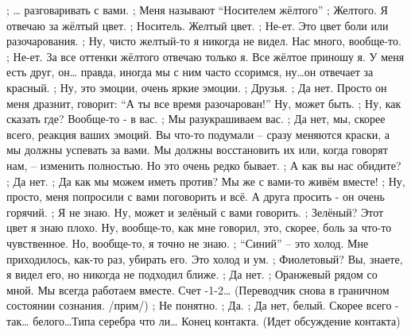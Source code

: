 ; …  разговаривать с вами.
; Меня называют ``Носителем жёлтого”
; Желтого. Я отвечаю за жёлтый цвет.
; Носитель. Желтый цвет.
; Не-ет. Это цвет  боли или разочарования.
; Ну, чисто желтый-то  я никогда не видел. Нас много, вообще-то.
; Не-ет. За все оттенки жёлтого отвечаю только я. Все жёлтое приношу я.  У меня есть друг,  он… правда, иногда мы с ним часто ссоримся, ну…он  отвечает за красный.
; Ну, это эмоции,  очень яркие эмоции.
; Друзья.
; Да нет. Просто он меня дразнит, говорит: ``А ты все время разочарован!'' Ну, может быть.
;  Ну, как сказать где? Вообще-то -  в вас.
; Мы разукрашиваем вас.
; Да нет, мы, скорее всего, реакция ваших эмоций. Вы что-то подумали – сразу меняются краски, а мы должны успевать за вами. Мы должны восстановить их или,  когда говорят нам, – изменить полностью. Но это очень редко бывает.
; А как вы нас обидите?
; Да нет.
; Да как мы можем иметь против? Мы же с вами-то живём вместе!
; Ну, просто, меня попросили с вами поговорить и всё.  А друга просить -  он очень горячий. 
; Я не знаю. Ну, может и зелёный с вами говорить.
; Зелёный? Этот цвет я знаю плохо. Ну, вообще-то, как мне говорил, это, скорее, боль за что-то чувственное. Но, вообще-то, я точно не знаю.
; ``Синий'' – это холод. Мне приходилось, как-то раз, убирать его. Это холод  и  ум.
; Фиолетовый? Вы, знаете, я видел его, но никогда не подходил ближе.
; Да нет. 
; Оранжевый рядом со мной. Мы всегда работаем вместе.
Счет -1-2…
(Переводчик снова в граничном состоянии сознания. /прим/)
; Не понятно. 
; Да.
; Да нет, белый. Скорее всего - так… белого…Типа серебра что ли…
Конец контакта.
(Идет обсуждение контакта)
